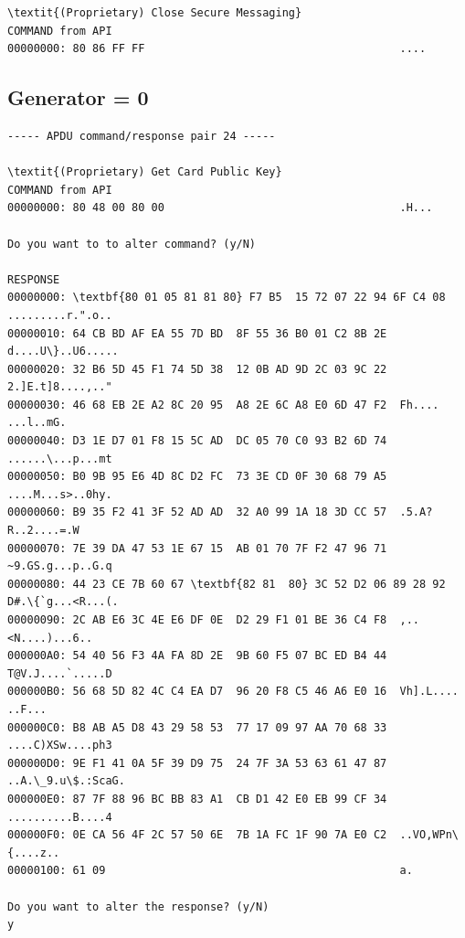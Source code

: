 \documentclass[bsc,frontabs,twoside,singlespacing,parskip,deptreport]{infthesis}     %
\begin{document}
\begin{appendices}
\begin{Verbatim}[commandchars=\\\{\}, fontsize=\small]
\textit{(Proprietary) Close Secure Messaging}
COMMAND from API
00000000: 80 86 FF FF                                       ....
\end{Verbatim}
\subsection{Generator = 0}
\begin{Verbatim}[commandchars=\\\{\}, fontsize=\small]
----- APDU command/response pair 24 -----

\textit{(Proprietary) Get Card Public Key}
COMMAND from API
00000000: 80 48 00 80 00                                    .H...

Do you want to to alter command? (y/N)

RESPONSE
00000000: \textbf{80 01 05 81 81 80} F7 B5  15 72 07 22 94 6F C4 08  .........r.".o..
00000010: 64 CB BD AF EA 55 7D BD  8F 55 36 B0 01 C2 8B 2E  d....U\}..U6.....
00000020: 32 B6 5D 45 F1 74 5D 38  12 0B AD 9D 2C 03 9C 22  2.]E.t]8....,.."
00000030: 46 68 EB 2E A2 8C 20 95  A8 2E 6C A8 E0 6D 47 F2  Fh.... ...l..mG.
00000040: D3 1E D7 01 F8 15 5C AD  DC 05 70 C0 93 B2 6D 74  ......\...p...mt
00000050: B0 9B 95 E6 4D 8C D2 FC  73 3E CD 0F 30 68 79 A5  ....M...s>..0hy.
00000060: B9 35 F2 41 3F 52 AD AD  32 A0 99 1A 18 3D CC 57  .5.A?R..2....=.W
00000070: 7E 39 DA 47 53 1E 67 15  AB 01 70 7F F2 47 96 71  ~9.GS.g...p..G.q
00000080: 44 23 CE 7B 60 67 \textbf{82 81  80} 3C 52 D2 06 89 28 92  D#.\{`g...<R...(.
00000090: 2C AB E6 3C 4E E6 DF 0E  D2 29 F1 01 BE 36 C4 F8  ,..<N....)...6..
000000A0: 54 40 56 F3 4A FA 8D 2E  9B 60 F5 07 BC ED B4 44  T@V.J....`.....D
000000B0: 56 68 5D 82 4C C4 EA D7  96 20 F8 C5 46 A6 E0 16  Vh].L.... ..F...
000000C0: B8 AB A5 D8 43 29 58 53  77 17 09 97 AA 70 68 33  ....C)XSw....ph3
000000D0: 9E F1 41 0A 5F 39 D9 75  24 7F 3A 53 63 61 47 87  ..A.\_9.u\$.:ScaG.
000000E0: 87 7F 88 96 BC BB 83 A1  CB D1 42 E0 EB 99 CF 34  ..........B....4
000000F0: 0E CA 56 4F 2C 57 50 6E  7B 1A FC 1F 90 7A E0 C2  ..VO,WPn\{....z..
00000100: 61 09                                             a.

Do you want to alter the response? (y/N)
y


\end{Verbatim}
\end{appendices}
\end{document}
